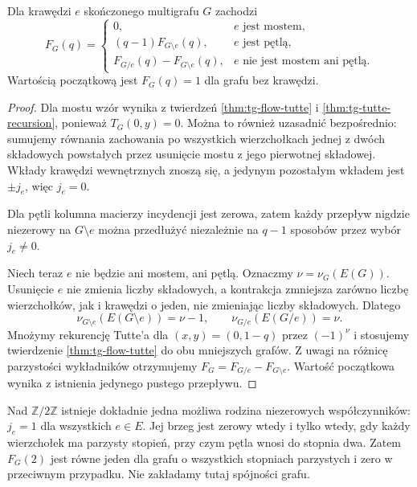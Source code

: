 \begin{wniosek}
\label{cor:tg-flow-recursion}
Dla krawędzi $e$ skończonego multigrafu $G$ zachodzi
\[
F_G(q)=
\begin{cases}
0,& e\text{ jest mostem},\\
(q-1)F_{G\setminus e}(q),& e\text{ jest pętlą},\\
F_{G/e}(q)-F_{G\setminus e}(q),&
e\text{ nie jest mostem ani pętlą}.
\end{cases}
\]
Wartością początkową jest $F_G(q)=1$ dla grafu bez krawędzi.
\end{wniosek}
\begin{proof}
Dla mostu wzór wynika z twierdzeń
\ref{thm:tg-flow-tutte} i \ref{thm:tg-tutte-recursion},
ponieważ $T_G(0,y)=0$.
Można to również uzasadnić bezpośrednio: sumujemy
równania zachowania po wszystkich wierzchołkach jednej
z dwóch składowych powstałych przez usunięcie mostu
z jego pierwotnej składowej. Wkłady krawędzi
wewnętrznych znoszą się, a jedynym pozostałym
wkładem jest $\pm j_e$, więc $j_e=0$.

Dla pętli kolumna macierzy incydencji jest zerowa,
zatem każdy przepływ nigdzie niezerowy na
$G\setminus e$ można przedłużyć niezależnie
na $q-1$ sposobów przez wybór $j_e\ne0$.

Niech teraz $e$ nie będzie ani mostem, ani pętlą.
Oznaczmy $\nu=\nu_G(E(G))$.
Usunięcie $e$ nie zmienia liczby składowych,
a kontrakcja zmniejsza zarówno liczbę wierzchołków,
jak i krawędzi o jeden, nie zmieniając liczby składowych.
Dlatego
\[
\nu_{G\setminus e}(E(G\setminus e))=\nu-1,\qquad
\nu_{G/e}(E(G/e))=\nu.
\]
Mnożymy rekurencję Tutte'a dla $(x,y)=(0,1-q)$
przez $(-1)^\nu$ i stosujemy twierdzenie
\ref{thm:tg-flow-tutte} do obu mniejszych grafów.
Z uwagi na różnicę parzystości wykładników otrzymujemy
$F_G=F_{G/e}-F_{G\setminus e}$.
Wartość początkowa wynika z istnienia jedynego
pustego przepływu.
\end{proof}

\begin{uwaga}
Nad $\mathbb Z/2\mathbb Z$ istnieje dokładnie jedna
możliwa rodzina niezerowych współczynników:
$j_e=1$ dla wszystkich $e\in E$.
Jej brzeg jest zerowy wtedy i tylko wtedy, gdy
każdy wierzchołek ma parzysty stopień, przy czym
pętla wnosi do stopnia dwa.
Zatem $F_G(2)$ jest równe jeden dla grafu o wszystkich
stopniach parzystych i zero w przeciwnym przypadku.
Nie zakładamy tutaj spójności grafu.
\end{uwaga}

